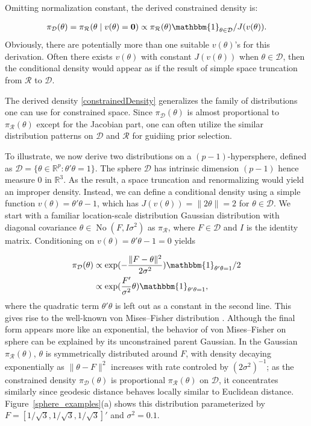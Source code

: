 \documentclass[10pt,fleqn]{article}
\newcommand{\be}{\begin{equation}\begin{aligned}}
\newcommand{\ee}{\end{aligned}\end{equation}}
\newcommand{\bb}[1]{\mathbb{#1}}
\newcommand{\mc}[1]{\mathcal{#1}}
\DeclareMathOperator{\No}{No}
\DeclareMathOperator{\1}{\mathbbm{1}}
\begin{document}
Omitting normalization constant, the derived constrained density is:

\be
\label{constrainedDensity}
\pi_{\mc D}(\theta)=\pi_{\mc R}(\theta\mid v(\theta)={\bf 0})\propto \pi_{\mc R}(\theta) \mathbbm{1}_{\theta\in \mc
D}/J(v(\theta)).
\ee
Obviously, there are potentially more than one suitable $v(\theta)$'s for
this derivation. Often there exists $v(\theta)$ with constant
$J(v(\theta))$ when $\theta\in\mc D$, then the conditional density would appear as if
the result of simple space truncation
from $\mc R$ to $\mc D$.

The derived density \eqref{constrainedDensity} generalizes the family of distributions one can use for constrained space. Since $\pi_{\mc D}(\theta)$
is almost proportional to $\pi_{\mc R}(\theta)$ except for the Jacobian part,
one can often utilize the similar distribution patterns on $\mc D$
and $\mc R$ for guidiing prior selection.


To illustrate, we now derive two distributions on a $(p-1)$-hypersphere, defined as $\mc
D=\{\theta\in
\bb R^p:\theta'\theta=1\}$. The sphere $\mc D$ has intrinsic dimension $(p-1)$ hence measure $0$ in $\bb R^3 $. As the result, a  space truncation and renormalizing would
yield an improper density. Instead, we can define a conditional density using
a simple  function  $v(\theta)=\theta'\theta-1$,
which has $J(v(\theta))=\|2\theta\|=2$ for $\theta\in \mc D$.
 We start with a familiar
location-scale distribution Gaussian distribution with diagonal
covariance $\theta \in \No(F,I\sigma^2)$ as $\pi_{\mc
R}$, where $F\in \mc D $ and $I$ is the identity matrix. Conditioning on $v(\theta)=\theta'\theta-1=0$ yields

\be
\pi_{\mc D}(\theta) &\propto
\exp(-\frac{\|F-\theta\|^2}{2\sigma^2})
\mathbbm{1}_{\theta'\theta=1}/2 \\
& \propto
\exp(\frac{F'}{\sigma^2}\theta)
\mathbbm{1}_{\theta'\theta=1}
,\ee
where the quadratic term $\theta'\theta$ is left out as a constant in the second line. This gives rise to the well-known von
Mises--Fisher distribution \citep{khatri1977mises}. Although the final form
appears more
like an exponential, the behavior of von
Mises--Fisher
on sphere can be explained by its unconstrained parent Gaussian.
In the Gaussian $\pi_{\mc
R}(\theta)$, $\theta$ is symmetrically distributed around $F$, with density
decaying exponentially as $\| \theta-F\|^2$ increases with rate controled by
$({2\sigma^2})^{-1}$; as the constrained
density $\pi_{\mc D}(\theta)$ is proportional $\pi_{\mc R}(\theta)$ on $\mc
D$, it concentrates
similarly since geodesic distance behaves locally similar to Euclidean distance.  Figure~\ref{sphere_examples}(a) shows this distribution parameterized by $F=[1/\sqrt{3},1/\sqrt{3},1/\sqrt{3}]'$ and $\sigma^2=0.1$.
\end{document}
